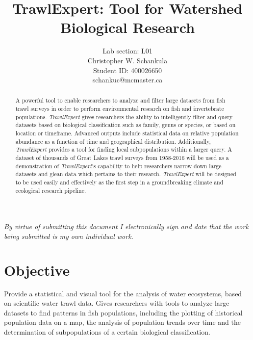 \documentclass{article}
\begin{document}
\title{TrawlExpert: Tool for Watershed Biological Research}
\author{Lab section: L01 \\ Christopher W. Schankula \\Student ID: 400026650 \\schankuc@mcmaster.ca}

\maketitle
\noindent\textit{By virtue of submitting this document I electronically sign and date that the work being submitted is my own individual work.}

\begin{abstract}
\noindent A powerful tool to enable researchers to analyze and filter large datasets from fish trawl surveys in order to perform environmental research on fish and invertebrate populations. \textit{TrawlExpert} gives researchers the ability to intelligently filter and query datasets based on biological classification such as family, genus or species, or based on location or timeframe. Advanced outputs include statistical data on relative population abundance as a function of time and geographical distribution. Additionally, \textit{TrawlExpert} provides a tool for finding local subpopulations within a larger query. A dataset of thousands of Great Lakes trawl surveys from 1958-2016 will be used as a demonstration of \textit{TrawlExpert}'s capability to help researchers narrow down large datasets and glean data which pertains to their research. \textit{TrawlExpert} will be designed to be used easily and effectively as the first step in a groundbreaking climate and ecological research pipeline.
\end{abstract}

\section{Objective}
Provide a statistical and visual tool for the analysis of water ecosystems, based on scientific water trawl data. Gives researchers with tools to analyze large datasets to find patterns in fish populations, including the plotting of historical population data on a map, the analysis of population trends over time and the determination of subpopulations of a certain biological classification.
\end{document}
